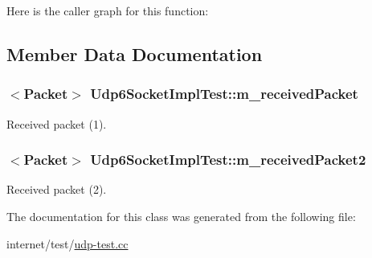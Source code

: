 Here is the caller graph for this function\+:




\subsection{Member Data Documentation}
\subsubsection[{\texorpdfstring{m\+\_\+received\+Packet}{m_receivedPacket}}]{$<${\bf Packet}$>$ Udp6\+Socket\+Impl\+Test\+::m\+\_\+received\+Packet\hspace{0.3cm}{\ttfamily [private]}}\hypertarget{classUdp6SocketImplTest_a0fe42d497152d2bbfa1660fbe5078c8a}{}\label{classUdp6SocketImplTest_a0fe42d497152d2bbfa1660fbe5078c8a}


Received packet (1). 

\subsubsection[{\texorpdfstring{m\+\_\+received\+Packet2}{m_receivedPacket2}}]{$<${\bf Packet}$>$ Udp6\+Socket\+Impl\+Test\+::m\+\_\+received\+Packet2\hspace{0.3cm}{\ttfamily [private]}}\hypertarget{classUdp6SocketImplTest_a7bd5d6c237574c130414e505553bd13b}{}\label{classUdp6SocketImplTest_a7bd5d6c237574c130414e505553bd13b}


Received packet (2). 



The documentation for this class was generated from the following file\+:\begin{DoxyCompactItemize}
\item 
internet/test/\hyperlink{udp-test_8cc}{udp-\/test.\+cc}\end{DoxyCompactItemize}
